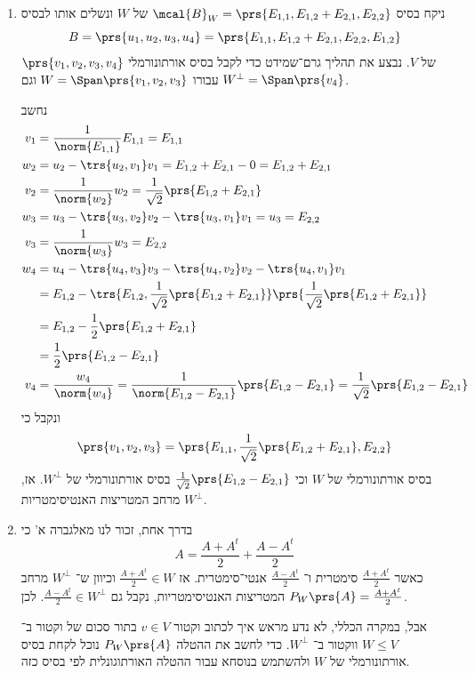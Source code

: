\documentclass[a4paper,10pt,twoside,openany]{book}
\begin{document}
\begin{solution}
\begin{enumerate}
\item
ניקח בסיס
$\mcal{B}_W = \prs{E_{1,1}, E_{1,2} + E_{2,1}, E_{2,2}}$
של
$W$
ונשלים אותו לבסיס
\[B = \prs{u_1, u_2, u_3, u_4} = \prs{E_{1,1}, E_{1,2} + E_{2,1}, E_{2,2}, E_{1,2}}\]
של
$V$.
נבצע את תהליך גרם־שמידט כדי לקבל בסיס אורתונורמלי
$\prs{v_1, v_2, v_3, v_4}$
עבורו
$W = \Span\prs{v_1, v_2, v_3}$
וגם
$W^\perp = \Span\prs{v_4}$.

נחשב
\begin{align*}
v_1 &= \frac{1}{\norm{E_{1,1}}} E_{1,1} = E_{1,1} \\
w_2 &= u_2 - \trs{u_2,v_1} v_1 = E_{1,2} + E_{2,1} - 0 = E_{1,2} + E_{2,1} \\
v_2 &= \frac{1}{\norm{w_2}} w_2 = \frac{1}{\sqrt{2}} \prs{E_{1,2} + E_{2,1}} \\
w_3 &= u_3 - \trs{u_3, v_2} v_2 - \trs{u_3, v_1} v_1 = u_3 = E_{2,2} \\
v_3 &= \frac{1}{\norm{w_3}} w_3 = E_{2,2} \\
w_4 &= u_4 - \trs{u_4, v_3}v_3 - \trs{u_4, v_2}v_2 - \trs{u_4, v_1}v_1 \\&= E_{1,2} - \trs{E_{1,2}, \frac{1}{\sqrt{2}} \prs{E_{1,2} + E_{2,1}}} \prs{\frac{1}{\sqrt{2}} \prs{E_{1,2} + E_{2,1}}}
\\&= E_{1,2} - \frac{1}{2} \prs{E_{1,2} + E_{2,1}}
\\&= \frac{1}{2} \prs{E_{1,2} - E_{2,1}} \\
v_4 &= \frac{w_4}{\norm{w_4}} = \frac{1}{\norm{E_{1,2} - E_{2,1}}} \prs{E_{1,2} - E_{2,1}} = \frac{1}{\sqrt{2}} \prs{E_{1,2} - E_{2,1}}
\end{align*}
ונקבל כי
\[\prs{v_1, v_2, v_3} = \prs{E_{1,1}, \frac{1}{\sqrt{2}} \prs{E_{1,2} + E_{2,1}}, E_{2,2}}\]
בסיס אורתונורמלי של
$W$
וכי
$\frac{1}{\sqrt{2}} \prs{E_{1,2} - E_{2,1}}$
בסיס אורתונורמלי של
$W^\perp$.
אז,
$W^\perp$
מרחב המטריצות האנטיסימטריות.

\item
בדרך אחת, זכור לנו מאלגברה א' כי
\[A = \frac{A + A^t}{2} + \frac{A - A^t}{2}\]
כאשר
$\frac{A + A^t}{2}$
סימטרית ו־%
$\frac{A - A^t}{2}$
אנטי־סימטרית.
אז
$\frac{A + A^t}{2} \in W$
וכיוון ש־%
$W^\perp$
מרחב המטריצות האנטיסימטריות, נקבל גם
$\frac{A - A^t}{2} \in W^\perp$.
לכן
$P_W\prs{A} = \frac{A + A^t}{2}$.

אבל, במקרה הכללי, לא נדע מראש איך לכתוב וקטור
$v \in V$
בתור סכום של וקטור ב־%
$W \leq V$
ווקטור ב־%
$W^\perp$.
כדי לחשב את ההטלה
$P_W\prs{A}$
נוכל לקחת בסיס אורתונורמלי של
$W$
ולהשתמש בנוסחא עבור ההטלה האורתוגונלית לפי בסיס כזה.


\end{enumerate}
\end{solution}
\end{document}
